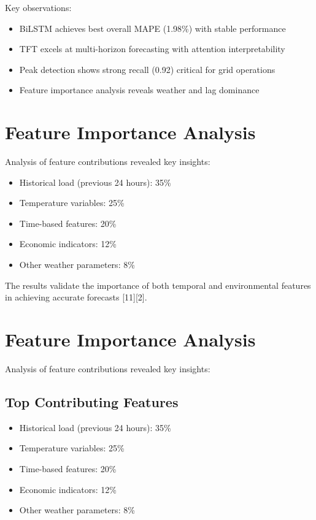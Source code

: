 \documentclass[12pt,a4paper]{report}
\begin{document}
Key observations:
\begin{itemize}
\item BiLSTM achieves best overall MAPE (1.98\%) with stable performance
\item TFT excels at multi-horizon forecasting with attention interpretability
\item Peak detection shows strong recall (0.92) critical for grid operations
\item Feature importance analysis reveals weather and lag dominance
\end{itemize}

\section{Feature Importance Analysis}
Analysis of feature contributions revealed key insights:

\begin{itemize}
\item Historical load (previous 24 hours): 35\%
\item Temperature variables: 25\%
\item Time-based features: 20\%
\item Economic indicators: 12\%
\item Other weather parameters: 8\%
\end{itemize}

The results validate the importance of both temporal and environmental features in achieving accurate forecasts [11][2].

\section{Feature Importance Analysis}
Analysis of feature contributions revealed key insights:

\subsection{Top Contributing Features}
\begin{itemize}
\item Historical load (previous 24 hours): 35\%
\item Temperature variables: 25\%
\item Time-based features: 20\%
\item Economic indicators: 12\%
\item Other weather parameters: 8\%
\end{itemize}
\end{document}
